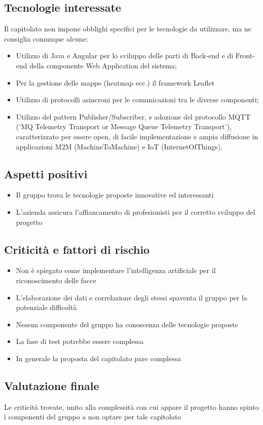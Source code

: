 \subsection{Tecnologie interessate}
Il capitolato non impone obblighi specifici per le tecnologie da utilizzare, ma ne consiglia comunque alcune:
\begin{itemize}
\item Utilizzo di Java e Angular per lo sviluppo delle parti di Back-end e di Front-end della componente Web
Application del sistema;
\item Per la gestione delle mappe (heatmap ecc.) il framework Leaflet
\item Utilizzo di protocolli asincroni per le comunicazioni tra le diverse componenti;
\item Utilizzo del pattern Publisher/Subscriber, e adozione del protocollo MQTT (‘MQ Telemetry Transport
or Message Queue Telemetry Transport’), caratterizzato per essere open, di facile implementazione
e ampia diffusione in applicazioni M2M (MachineToMachine) e IoT (InternetOfThings).
\end{itemize}

\subsection{Aspetti positivi}
\begin{itemize}
\item Il gruppo trova le tecnologie proposte innovative ed interessanti 
\item L'azienda assicura l'affiancamento di profesionisti per il corretto sviluppo del progetto
\end{itemize}

\subsection{Criticità e fattori di rischio}
\begin{itemize}
\item Non è spiegato come implementare l'intelligenza artificiale per il riconoscimento delle facce
\item L'elaborazione dei dati e correlazione degli stessi spaventa il gruppo per la potenziale difficoltà
\item Nessun componente del gruppo ha conoscenza delle tecnologie proposte
\item La fase di test potrebbe essere complessa
\item In generale la proposta del capitolato pare complessa
\end{itemize}

\subsection{Valutazione finale}
Le criticità trovate, unito alla complessità con cui appare il progetto hanno spinto i componenti del gruppo a non optare per tale capitolato	
